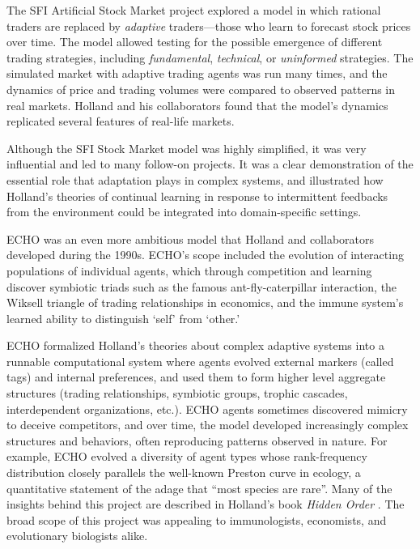\documentclass{sig-alternate}
\begin{document}
The SFI Artificial Stock Market project \cite{Arthur1997,Palmer1994} explored a model in which rational
traders are replaced by \emph{adaptive} traders---those who learn to
forecast stock prices over time.  The model allowed testing for the
possible emergence of different trading strategies, including
\emph{fundamental}, \emph{technical}, or \emph{uninformed}
strategies. The simulated market with adaptive trading agents was run
many times, and the dynamics of price and trading volumes were
compared to observed patterns in real markets.  Holland and his
collaborators found that the model's dynamics replicated several
features of real-life markets.

Although the SFI Stock Market model was highly simplified, it was very
influential and led to many follow-on projects.  It was a clear
demonstration of the essential role that adaptation plays in complex
systems, and illustrated how Holland's theories of continual learning
in response to intermittent feedbacks from the environment could be
integrated into domain-specific settings.

ECHO \cite{Holland1999,Hraber1997} was an even more ambitious model
that Holland and collaborators developed during the 1990s.  ECHO's
scope included the evolution of interacting populations of individual
agents, which through competition and learning discover symbiotic
triads such as the famous ant-fly-caterpillar interaction, the Wiksell
triangle of trading relationships in economics, and the immune
system's learned ability to distinguish `self' from `other.'

ECHO formalized Holland's theories about complex adaptive systems into
a runnable computational system where agents evolved external markers
(called tags) and internal preferences, and used them to form higher
level aggregate structures (trading relationships, symbiotic groups,
trophic cascades, interdependent organizations, etc.).  ECHO agents
sometimes discovered mimicry to deceive competitors, and over time,
the model developed increasingly complex structures and behaviors,
often reproducing patterns observed in nature.  For example, ECHO
evolved a diversity of agent types whose rank-frequency distribution
closely parallels the well-known Preston curve in ecology, a
quantitative statement of the adage that ``most species are rare''. Many
of the insights behind this project are described in Holland's book \emph{Hidden Order} \cite{Holland1995}. 
The broad scope of this project was appealing to immunologists, economists, and evolutionary biologists alike.  
\end{document}
